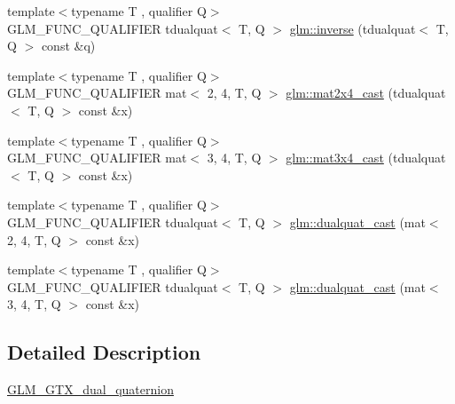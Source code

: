 \begin{DoxyCompactItemize}
{\footnotesize template$<$typename T , qualifier Q$>$ }\\G\+L\+M\+\_\+\+F\+U\+N\+C\+\_\+\+Q\+U\+A\+L\+I\+F\+I\+ER tdualquat$<$ T, Q $>$ \hyperlink{group__gtx__dual__quaternion_ga070f521a953f6461af4ab4cf8ccbf27e}{glm\+::inverse} (tdualquat$<$ T, Q $>$ const \&q)
\item 
{\footnotesize template$<$typename T , qualifier Q$>$ }\\G\+L\+M\+\_\+\+F\+U\+N\+C\+\_\+\+Q\+U\+A\+L\+I\+F\+I\+ER mat$<$ 2, 4, T, Q $>$ \hyperlink{group__gtx__dual__quaternion_gae99d143b37f9cad4cd9285571aab685a}{glm\+::mat2x4\+\_\+cast} (tdualquat$<$ T, Q $>$ const \&x)
\item 
{\footnotesize template$<$typename T , qualifier Q$>$ }\\G\+L\+M\+\_\+\+F\+U\+N\+C\+\_\+\+Q\+U\+A\+L\+I\+F\+I\+ER mat$<$ 3, 4, T, Q $>$ \hyperlink{group__gtx__dual__quaternion_gaf59f5bb69620d2891c3795c6f2639179}{glm\+::mat3x4\+\_\+cast} (tdualquat$<$ T, Q $>$ const \&x)
\item 
{\footnotesize template$<$typename T , qualifier Q$>$ }\\G\+L\+M\+\_\+\+F\+U\+N\+C\+\_\+\+Q\+U\+A\+L\+I\+F\+I\+ER tdualquat$<$ T, Q $>$ \hyperlink{group__gtx__dual__quaternion_gac4064ff813759740201765350eac4236}{glm\+::dualquat\+\_\+cast} (mat$<$ 2, 4, T, Q $>$ const \&x)
\item 
{\footnotesize template$<$typename T , qualifier Q$>$ }\\G\+L\+M\+\_\+\+F\+U\+N\+C\+\_\+\+Q\+U\+A\+L\+I\+F\+I\+ER tdualquat$<$ T, Q $>$ \hyperlink{group__gtx__dual__quaternion_ga91025ebdca0f4ea54da08497b00e8c84}{glm\+::dualquat\+\_\+cast} (mat$<$ 3, 4, T, Q $>$ const \&x)
\end{DoxyCompactItemize}


\subsection{Detailed Description}
\hyperlink{group__gtx__dual__quaternion}{G\+L\+M\+\_\+\+G\+T\+X\+\_\+dual\+\_\+quaternion} 